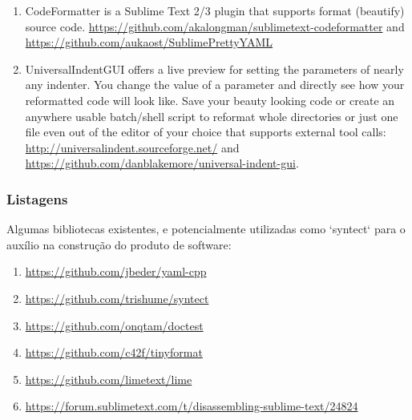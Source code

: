 {\begin{myquote}
\begin{enumerate}[leftmargin=*]
        Google-java-format is a program that reformats Java source code to comply with Google Java
        Style: \url{https://github.com/google/google-java-format}.

        \item

        CodeFormatter is a Sublime Text 2/3 plugin that supports format (beautify) source code.
        \url{https://github.com/akalongman/sublimetext-codeformatter} and
        \url{https://github.com/aukaost/SublimePrettyYAML}

        \item

        UniversalIndentGUI offers a live preview for setting the parameters of nearly any indenter.
        You change the value of a parameter and directly see how your reformatted code will look
        like. Save your beauty looking code or create an anywhere usable batch/shell script to
        reformat whole directories or just one file even out of the editor of your choice that
        supports external tool calls: \url{http://universalindent.sourceforge.net/} and
        \url{https://github.com/danblakemore/universal-indent-gui}.

    \end{enumerate}
    \end{myquote}


\subsubsection{Listagens}

    Algumas bibliotecas existentes, e potencialmente utilizadas como `syntect` para o auxílio na
    construção do produto de software:

    \begin{myquote}
    \begin{enumerate}[leftmargin=*,parsep=0pt]

        \item \url{https://github.com/jbeder/yaml-cpp}
        \item \url{https://github.com/trishume/syntect}
        \item \url{https://github.com/onqtam/doctest}
        \item \url{https://github.com/c42f/tinyformat}
        \item \url{https://github.com/limetext/lime}
        \item \url{https://forum.sublimetext.com/t/disassembling-sublime-text/24824}


\end{enumerate}
\end{myquote}}
